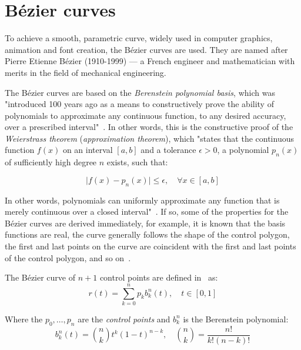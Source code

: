 \section{Bézier curves}\label{sec:bezier-curves}
To achieve a smooth, parametric curve, widely used in computer graphics, animation and font creation, the Bézier curves are used.
They are named after Pierre Etienne Bézier (1910-1999) --- a French engineer and mathematician with merits in the field of mechanical engineering.

The Bézier curves are based on the \textit{Berenstein polynomial basis}, which was "introduced 100 years ago as a means to constructively prove the ability of polynomials to approximate any continuous function, to any desired accuracy, over a prescribed interval"~\cite{farouki2012bernstein}.
In other words, this is the constructive proof of the \textit{Weierstrass theorem} (\textit{approximation theorem}), which "states that the continuous function $f(x)$ on an interval $[a, b]$ and a tolerance $\epsilon > 0$, a polynomial $p_n(x)$ of sufficiently high degree $n$ exists, such that:

\begin{equation}
    \mid f(x) - p_n(x) \mid \leq \epsilon, \quad \forall x \in \left[ a,b \right]\label{eq:weierstrass-error}
\end{equation}

In other words, polynomials can uniformly approximate any function that is merely continuous over a closed interval"~\cite{farouki2012bernstein}.
If so, some of the properties for the Bézier curves are derived immediately, for example, it is known that the basis functions are real, the curve generally follows the shape of the control polygon, the first and last points on the curve are coincident with the first and last points of the control polygon, and so on~\cite{bezier-curves}.

The Bézier curve of $n+1$ control points are defined in~\cite{farouki2012bernstein} as:
\begin{equation}
    r(t) = \sum_{k=0}^n p_k b_k^n(t),  \quad t \in [0,1]\label{eq:bezier-control-points}
\end{equation}

Where the $p_0,\dots,p_n$ are the \textit{control points} and $b_k^n$ is the Berenstein polynomial:
\begin{equation}
    b_k^n(t) = \binom{n}{k} t^k (1-t)^{n-k}, \quad \binom{n}{k} = \frac{n!}{k!(n-k)!}\label{eq:berenstrain-polynomial}
\end{equation}

